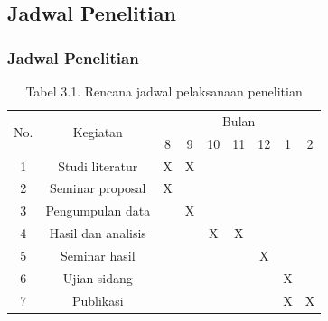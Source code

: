 \documentclass{beamer}
\begin{document}
\subsection{Jadwal Penelitian}
\begin{frame}
	\frametitle{Jadwal Penelitian}
		\begin{table}[htp]
			\centering
			\captionsetup{labelformat=empty}
			\caption{Tabel 3.1. Rencana jadwal pelaksanaan penelitian}
			\label{table:jadwal}
			\begin{tabular}{|c|c|ccccccc|}
				\hline
				\multirow{2}{*}{No.} & \multirow{2}{*}{Kegiatan} & \multicolumn{7}{c|}{Bulan}                                                                                                                            \\ \cline{3-9} 
				&                   & \multicolumn{1}{c|}{8} & \multicolumn{1}{c|}{9} & \multicolumn{1}{c|}{10} & \multicolumn{1}{c|}{11} & \multicolumn{1}{c|}{12} & \multicolumn{1}{c|}{1} &  2 \\ \hline 1
				& Studi literatur   & \multicolumn{1}{c|}{X} & \multicolumn{1}{c|}{X} & \multicolumn{1}{c|}{} & \multicolumn{1}{c|}{} & \multicolumn{1}{c|}{} & \multicolumn{1}{c|}{} &  \\ \hline 2
				& Seminar proposal    & \multicolumn{1}{c|}{X} & \multicolumn{1}{c|}{} & \multicolumn{1}{c|}{} & \multicolumn{1}{c|}{} & \multicolumn{1}{c|}{} & \multicolumn{1}{c|}{} &  \\ \hline 3
				& Pengumpulan data    & \multicolumn{1}{c|}{} & \multicolumn{1}{c|}{X} & \multicolumn{1}{c|}{} & \multicolumn{1}{c|}{} & \multicolumn{1}{c|}{} & \multicolumn{1}{c|}{} &  \\ \hline 4
				& Hasil dan analisis  & \multicolumn{1}{c|}{} & \multicolumn{1}{c|}{} & \multicolumn{1}{c|}{X} & \multicolumn{1}{c|}{X} & \multicolumn{1}{c|}{} & \multicolumn{1}{c|}{} &  \\ \hline 5
				& Seminar hasil       & \multicolumn{1}{c|}{} & \multicolumn{1}{c|}{} & \multicolumn{1}{c|}{} & \multicolumn{1}{c|}{} & \multicolumn{1}{c|}{X} & \multicolumn{1}{c|}{} &  \\ \hline 6
				& Ujian sidang        & \multicolumn{1}{c|}{} & \multicolumn{1}{c|}{} & \multicolumn{1}{c|}{} & \multicolumn{1}{c|}{} & \multicolumn{1}{c|}{} & \multicolumn{1}{c|}{X} &  \\ \hline 7
				& Publikasi           & \multicolumn{1}{c|}{} & \multicolumn{1}{c|}{} & \multicolumn{1}{c|}{} & \multicolumn{1}{c|}{} & \multicolumn{1}{c|}{} & \multicolumn{1}{c|}{X} & X  \\ \hline 
			\end{tabular}
		\end{table}
\end{frame}
\end{document}
